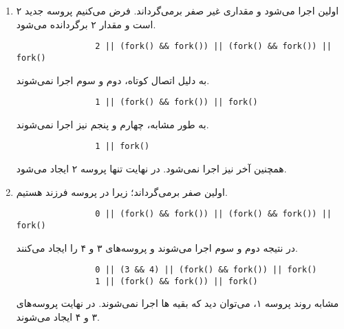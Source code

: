 \documentclass{article}
\begin{document}
	\begin{enumerate}[label=\textbf{پروسه \arabic*}:, leftmargin=6em]
		\item
		اولین
		اجرا می‌شود و مقداری غیر صفر برمی‌گرداند. فرض می‌کنیم
		پروسه جدید ۲ است و مقدار ۲ برگردانده می‌شود.
		\begin{latin}
			\begin{verbatim}
				2 || (fork() && fork()) || (fork() && fork()) || fork()
			\end{verbatim}
		\end{latin}

	به دلیل اتصال کوتاه،
	دوم و سوم اجرا نمی‌شوند.
		\begin{latin}
			\begin{verbatim}
				1 || (fork() && fork()) || fork()
			\end{verbatim}
		\end{latin}

		به طور مشابه،
		چهارم و پنجم نیز اجرا نمی‌شوند.

		\begin{latin}
			\begin{verbatim}
				1 || fork()
			\end{verbatim}
		\end{latin}

		همچنین
		آخر نیز اجرا نمی‌شود. در نهایت تنها پروسه ۲ ایجاد می‌شود.

		\item
		اولین
		صفر برمی‌گرداند؛ زیرا در پروسه فرزند هستیم.
		\begin{latin}
			\begin{verbatim}
				0 || (fork() && fork()) || (fork() && fork()) || fork()
			\end{verbatim}
		\end{latin}
		در نتیجه
		دوم و سوم اجرا می‌شوند و پروسه‌های ۳ و ۴ را ایجاد می‌کنند.

		 \begin{latin}
		 	\begin{verbatim}
		 		0 || (3 && 4) || (fork() && fork()) || fork()
		 		1 || (fork() && fork()) || fork()
		 	\end{verbatim}
		 \end{latin}

	 	مشابه روند پروسه ۱، می‌توان دید که بقیه
	 	‌ها
	 	اجرا نمی‌شوند. در نهایت پروسه‌های ۳ و ۴ ایجاد می‌شوند.


\end{enumerate}
\end{document}
